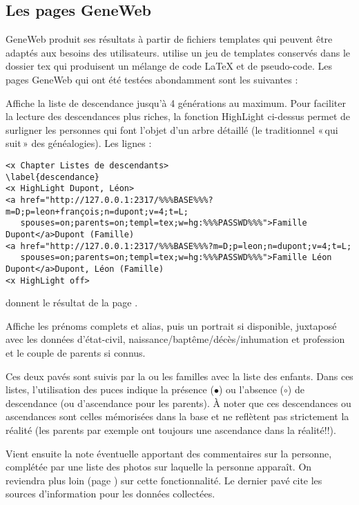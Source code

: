 \subsection{Les pages GeneWeb}

GeneWeb produit ses résultats à partir de fichiers templates qui peuvent être
adaptés aux besoins des utilisateurs.
\gwtol{} utilise un jeu de templates conservés dans le dossier tex qui
produisent un mélange de code \LaTeX{} et de pseudo-code.
Les pages GeneWeb qui ont été testées abondamment sont les suivantes :

\begin{description}[style=nextline]
\item[Liste de descendance] Affiche la liste de descendance jusqu'à 4
générations au maximum. Pour faciliter la lecture des descendances plus riches,
la fonction HighLight ci-dessus permet de surligner les personnes
qui font l'objet d'un arbre détaillé (le traditionnel «\,qui suit\,» des généalogies).
Les lignes :
\begin{verbatim}
<x Chapter Listes de descendants>
\label{descendance}
<x HighLight Dupont, Léon>
<a href="http://127.0.0.1:2317/%%%BASE%%%?m=D;p=leon+françois;n=dupont;v=4;t=L;
   spouses=on;parents=on;templ=tex;w=hg:%%%PASSWD%%%">Famille Dupont</a>Dupont (Famille)
<a href="http://127.0.0.1:2317/%%%BASE%%%?m=D;p=leon;n=dupont;v=4;t=L;
   spouses=on;parents=on;templ=tex;w=hg:%%%PASSWD%%%">Famille Léon Dupont</a>Dupont, Léon (Famille)
<x HighLight off>
\end{verbatim}
donnent le résultat de la page \pageref{descendance}.

\item[Page perso] Affiche les prénoms complets et alias, puis
un portrait si disponible, juxtaposé avec les
données d'état-civil, naissance/baptême/décès/inhumation et profession
et le couple de parents si connus.

Ces deux pavés sont suivis par la ou les familles avec la liste des enfants.
Dans ces listes, l'utilisation des puces indique la présence ($\bullet$)
ou l'absence ($\circ$) de descendance (ou d'ascendance pour les parents).
À noter que ces descendances ou ascendances sont celles mémorisées dans la base
et ne reflètent pas strictement la réalité (les parents par exemple ont toujours
une ascendance dans la réalité!!).

Vient ensuite la note éventuelle apportant des commentaires sur la personne,
complétée par une liste des photos sur laquelle la personne apparaît.
On reviendra plus loin (page \pageref{images}) sur cette fonctionnalité.
Le dernier pavé cite les sources d'information pour les données collectées.


\end{description}
